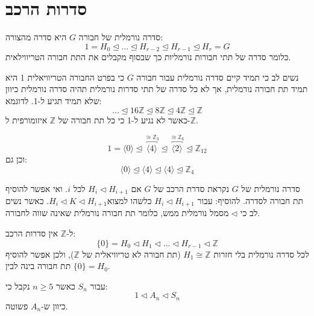 \documentclass{tstextbook}
\begin{document}
\section{סדרות הרכב}

\begin{definition}
סדרה נורמלית של חבורה \(G\) היא סדרה מהצורה:
$$1=H_{0}\trianglelefteq \dots \trianglelefteq H_{r-2}\trianglelefteq H_{r-1}\trianglelefteq H_{r}=G$$
כלומר סדרה של תתי חבורות נורמליות כך שבסוף מקבלים את התת חבורה הטריווילאית.

\end{definition}
\begin{remark}
נשים לב כי תמיד קיים סדרה נורמלית עבור חבורה \(G\) כי בפרט החבורה הטריוויאלית 1 היא תמיד תת חבורה נורמלית, אך לא כל סדרה של תתי סדרות נורמלית תהיה סדרה נורמלית כיוון שלא תמיד תגיע ל-1. לדוגמא:
$$\dots \trianglelefteq 16\mathbb{Z}\trianglelefteq 8\mathbb{Z} \trianglelefteq 4\mathbb{Z}  \trianglelefteq \mathbb{Z}$$
כאשר לא נגיע ל-1 כי כל תת חבורה של \(\mathbb{Z}\) איזומורפית ל-\(\mathbb{Z}\).

\end{remark}
\begin{example}
$$1=\langle 0\rangle \trianglelefteq \overbracket{ \langle 4\rangle }^{ \cong \mathbb{Z} _{3} } \trianglelefteq \overbracket{ \langle 2\rangle  }^{ \cong \mathbb{Z} _{6} } \trianglelefteq \mathbb{Z} _{12}$$
וכן גם:
$$\langle 0\rangle \trianglelefteq \langle 4\rangle \trianglelefteq  \langle 4\rangle \trianglelefteq  \mathbb{Z} _{4}$$

\end{example}
\begin{definition}
סדרה נורמלית של \(G\) נקראת סדרת הרכב של \(G\) אם \(H_{i}\triangleleft H_{i+1}\) לכל \(i\). ואי אפשר להוסיף תת חבורה לסדרה.
להוסיף: עבור \(H_{i}\triangleleft H_{i+1}\) כלשהו למצוא\(H_{i}\triangleleft K\triangleleft H_{i+1}\). כאשר נשים לב כי \(\triangleleft\) מסמל נורמלית ממש, כלומר תת חבורה נורמלית שאינה שווה לחבורה.

\end{definition}
\begin{corollary}
ל-\(\mathbb{Z}\) אין סדרות הרכב:
$$\{ 0 \}=H_{0}\triangleleft H_{1}\triangleleft \dots \triangleleft H_{r-1}\triangleleft \mathbb{Z}$$
לכל סדרה נורמלית בלי חזרות \(H_{1}\cong\mathbb{Z}\) (תת חבורה לא טריוויאלית של \(\mathbb{Z}\)), ולכן אפשר להוסיף תת חבורה בינה לבין \(\{ 0 \}=H_{0}\).

\end{corollary}
\begin{corollary}
עבור \(S_{n}\) כאשר \(n\geq 5\) נקבל כי:
$$1\triangleleft A_{n}\triangleleft S_{n}$$
כיוון ש-\(A_{n}\) פשוטה.

\end{corollary}
\end{document}
